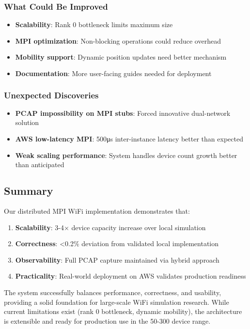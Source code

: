 \subsubsection{What Could Be Improved}

\begin{itemize}
    \item \textbf{Scalability}: Rank 0 bottleneck limits maximum size
    \item \textbf{MPI optimization}: Non-blocking operations could reduce overhead
    \item \textbf{Mobility support}: Dynamic position updates need better mechanism
    \item \textbf{Documentation}: More user-facing guides needed for deployment
\end{itemize}

\subsubsection{Unexpected Discoveries}

\begin{itemize}
    \item \textbf{PCAP impossibility on MPI stubs}: Forced innovative dual-network solution
    \item \textbf{AWS low-latency MPI}: 500μs inter-instance latency better than expected
    \item \textbf{Weak scaling performance}: System handles device count growth better than anticipated
\end{itemize}

\subsection{Summary}

Our distributed MPI WiFi implementation demonstrates that:
\begin{enumerate}
    \item \textbf{Scalability}: 3-4× device capacity increase over local simulation
    \item \textbf{Correctness}: <0.2\% deviation from validated local implementation
    \item \textbf{Observability}: Full PCAP capture maintained via hybrid approach
    \item \textbf{Practicality}: Real-world deployment on AWS validates production readiness
\end{enumerate}

The system successfully balances performance, correctness, and usability, providing a solid foundation for large-scale WiFi simulation research. While current limitations exist (rank 0 bottleneck, dynamic mobility), the architecture is extensible and ready for production use in the 50-300 device range.
